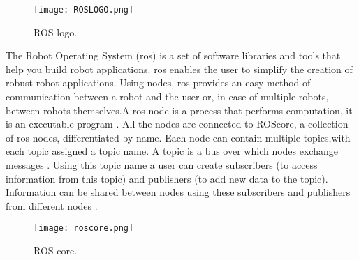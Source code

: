 \begin{figure}[ht]
    \centering
    \texttt{[image: ROSLOGO.png]}
    \caption[ROS logo]{ROS logo\footnotemark.}
\end{figure}

The Robot Operating System (\acs{ros}) is a set of software libraries and tools that help you build robot applications.
\acs{ros} enables the user to simplify the creation of robust robot applications. Using nodes, \acs{ros} provides an easy method of 
communication between a robot and the user or, in case of multiple robots, between robots themselves.A \acs{ros} node is a process 
that performs computation, it is an executable program \cite{ros:node}. All the nodes are 
connected to ROScore, a collection of \acs{ros} nodes, differentiated by name. Each node can contain multiple topics,with each topic 
assigned a topic name. A topic is a bus over which nodes exchange messages \cite{ros:topic}.
Using this topic name a user can create subscribers (to access information from this topic) and publishers (to add new data to the topic). 
Information can be shared between nodes using these subscribers and publishers from different nodes \cite{ros:about}.

\begin{figure}[ht]
    \centering
    \texttt{[image: roscore.png]}
    \caption[ROS core]{ROS core\footnotemark.}
\end{figure}
